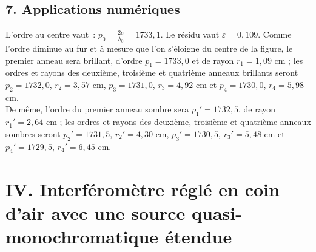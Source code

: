 \documentclass{article}
\renewcommand{\epsilon}{\varepsilon}
\begin{document}
\subsection*{7.  Applications numériques}
L'ordre au centre vaut : $p_{0} = \frac{2e}{\lambda_{0}} = 1733,1$.
Le résidu vaut $\epsilon = 0,109$. Comme l'ordre diminue au fur et à
mesure que l'on s'éloigne du centre de la figure, le premier anneau
sera brillant, d'ordre $p_{1} = 1733,0$ et de rayon $r_{1} = 1,09$
cm ; les ordres et rayons des  deuxième, troisième et quatrième
anneaux brillants seront $p_{2} = 1732,0$, $r_{2} = 3,57$ cm, $p_{3}
= 1731,0$, $r_{3} = 4,92$ cm et $p_{4} = 1730,0$, $r_{4}
= 5,98$ cm. \\
De même, l'ordre du premier anneau sombre sera $p_{1}' = 1732,5$, de
rayon $r_{1}' = 2,64$ cm ; les ordres et rayons des  deuxième,
troisième et quatrième anneaux sombres seront $p_{2}' = 1731,5$,
$r_{2}' = 4,30$ cm, $p_{3}' = 1730,5$, $r_{3}' = 5,48$ cm et $p_{4}'
= 1729,5$, $r_{4}' = 6,45$ cm.

\section*{IV. Interféromètre réglé en coin d'air avec une source
quasi-monochromatique étendue}
\end{document}
